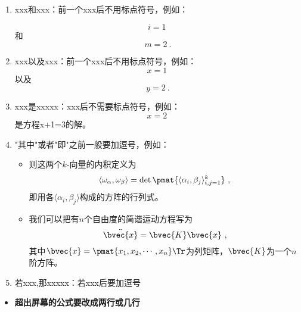 \begin{enumerate}
\item xxx和xxx：前一个xxx后不用标点符号，例如：

\begin{equation}
i=1~
\end{equation}
和
\begin{equation}
m=2~.
\end{equation}
\item xxx以及xxx：前一个xxx后不用标点符号，例如：
\begin{equation}
x=1~
\end{equation}
以及
\begin{equation}
y=2~.
\end{equation}

 \item xxx是xxxxx：xxx后不需要标点符号，例如：
\begin{equation}
x=2~
\end{equation}
是方程x+1=3的解。
\item "其中"或者"即"之前一般要加逗号，例如：
\begin{itemize}
\item 则这两个$k$-向量的内积定义为
\begin{equation}
\langle\omega_\alpha, \omega_\beta\rangle = \det \pmat{\langle \alpha_i, \beta_j \rangle_{i, j=1}^k}~,
\end{equation}
即用各$\langle \alpha_i, \beta_j \rangle$构成的方阵的行列式。
\end{itemize}
\begin{itemize}
\item 
我们可以把有$n$个自由度的简谐运动方程写为
\begin{equation}
\ddot{\bvec{x}} = \bvec{K}\bvec{x}~,
\end{equation}
其中$\bvec{x}=\pmat{x_1, x_2, \cdots, x_n}\Tr$为列矩阵，$\bvec{K}$为一个$n$阶方阵。

\end{itemize}
\item 若xxx,那xxxxx：若xxx后要加逗号

\end{enumerate}
\begin{itemize}
\item \textbf{超出屏幕的公式要改成两行或几行}
\end{itemize}




